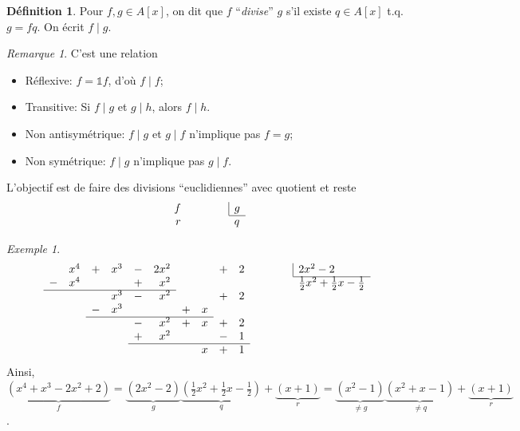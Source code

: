 \documentclass{report}
\theoremstyle{definition}
\newtheorem*{dfn}{D\'efinition}
\theoremstyle{remark}
\newtheorem*{exem}{Exemple}
\newtheorem*{rmq}{Remarque}
\def\id{\mathds{1}}
\newcommand*{\arst}[1]{\renewcommand{\arraystretch}{#1}}
\begin{document}
	\begin{dfn}
		Pour $f,g \in A[x]$, on dit que $f$ ``\emph{divise}'' $g$ s'il existe $q\in A[x]$ t.q. $g=fq$. On \'ecrit $f \mid g$.
	\end{dfn}

	\begin{rmq}
		C'est une relation
		\begin{itemize}
			\item R\'eflexive: $f=\id f$, d'o\`u $f \mid f$;
			\item Transitive: Si $f \mid g$ et $g \mid h$, alors $f \mid h$.
		\end{itemize}
		\begin{itemize}
			\item Non antisym\'etrique: $f \mid g$ et $g \mid f$ n'implique pas $f=g$;
			\item Non sym\'etrique: $f \mid g$ n'implique pas $g \mid f$.
		\end{itemize}
	\end{rmq}

	L'objectif est de faire des divisions ``euclidiennes'' avec quotient et reste
	\arst{1.2}
	\[ \begin{array}{rp{1cm}l}
		f&&\multicolumn{1}{|l}{g}\\
		\cline{3-3} r&&q
	\end{array} \]
	\arst{1}

	\begin{exem}
		\arst{1.4}
		\[ \begin{array}{rrrrrrrrrrp{1cm}l}
			&x^4&+&x^3&-&2x^2&&&+&2&&\multicolumn{1}{|l}{2x^2-2}\\
			\cline{12-12} -&x^4&&&+&x^2&&&&&&\frac{1}{2}x^2+\frac{1}{2}x-\frac{1}{2}\\
			\cline{1-6} &&&x^3&-&x^2&&&+&2\\
			&&-&x^3&&&+&x\\
			\cline{3-8} &&&&-&x^2&+&x&+&2\\
			&&&&+&x^2&&&-&1\\
			\cline{5-10} &&&&&&&x&+&1
		\end{array} \]
		\arst{1}
		Ainsi, $\underbrace{(x^4+x^3-2x^2+2)}_{f} = \underbrace{(2x^2-2)}_{g} \underbrace{\left( \frac{1}{2}x^2+\frac{1}{2}x-\frac{1}{2} \right)}_{q} + \underbrace{(x+1)}_{r} = \underbrace{(x^2-1)}_{\neq g} \underbrace{(x^2+x-1)}_{\neq q} + \underbrace{(x+1)}_{r}$.
	\end{exem}
\end{document}
